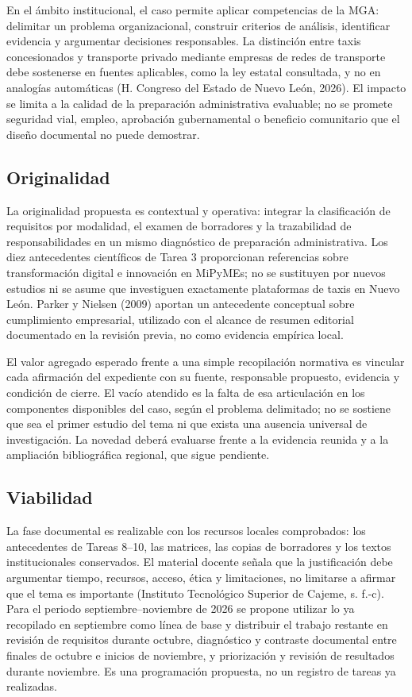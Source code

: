 {En el ámbito institucional, el caso permite aplicar competencias de la MGA: delimitar un problema organizacional, construir criterios de análisis, identificar evidencia y argumentar decisiones responsables. La distinción entre taxis concesionados y transporte privado mediante empresas de redes de transporte debe sostenerse en fuentes aplicables, como la ley estatal consultada, y no en analogías automáticas (H. Congreso del Estado de Nuevo León, 2026). El impacto se limita a la calidad de la preparación administrativa evaluable; no se promete seguridad vial, empleo, aprobación gubernamental o beneficio comunitario que el diseño documental no puede demostrar.


\subsection{Originalidad}
La originalidad propuesta es contextual y operativa: integrar la clasificación de requisitos por modalidad, el examen de borradores y la trazabilidad de responsabilidades en un mismo diagnóstico de preparación administrativa. Los diez antecedentes científicos de Tarea 3 proporcionan referencias sobre transformación digital e innovación en MiPyMEs; no se sustituyen por nuevos estudios ni se asume que investiguen exactamente plataformas de taxis en Nuevo León. Parker y Nielsen (2009) aportan un antecedente conceptual sobre cumplimiento empresarial, utilizado con el alcance de resumen editorial documentado en la revisión previa, no como evidencia empírica local.


El valor agregado esperado frente a una simple recopilación normativa es vincular cada afirmación del expediente con su fuente, responsable propuesto, evidencia y condición de cierre. El vacío atendido es la falta de esa articulación en los componentes disponibles del caso, según el problema delimitado; no se sostiene que sea el primer estudio del tema ni que exista una ausencia universal de investigación. La novedad deberá evaluarse frente a la evidencia reunida y a la ampliación bibliográfica regional, que sigue pendiente.


\subsection{Viabilidad}
La fase documental es realizable con los recursos locales comprobados: los antecedentes de Tareas 8–10, las matrices, las copias de borradores y los textos institucionales conservados. El material docente señala que la justificación debe argumentar tiempo, recursos, acceso, ética y limitaciones, no limitarse a afirmar que el tema es importante (Instituto Tecnológico Superior de Cajeme, s. f.-c). Para el periodo septiembre–noviembre de 2026 se propone utilizar lo ya recopilado en septiembre como línea de base y distribuir el trabajo restante en revisión de requisitos durante octubre, diagnóstico y contraste documental entre finales de octubre e inicios de noviembre, y priorización y revisión de resultados durante noviembre. Es una programación propuesta, no un registro de tareas ya realizadas.


}
